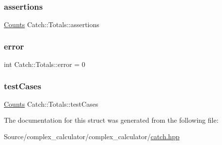 \subsubsection{\texorpdfstring{assertions}{assertions}}
{\footnotesize\ttfamily \mbox{\hyperlink{struct_catch_1_1_counts}{Counts}} Catch\+::\+Totals\+::assertions}

\mbox{\label{struct_catch_1_1_totals_a6ea14c7de7ea735a14f172a26e08a239}} 
\subsubsection{\texorpdfstring{error}{error}}
{\footnotesize\ttfamily int Catch\+::\+Totals\+::error = 0}

\mbox{\label{struct_catch_1_1_totals_adb195fe477aedee2ecea88c888f16506}} 
\subsubsection{\texorpdfstring{test\+Cases}{testCases}}
{\footnotesize\ttfamily \mbox{\hyperlink{struct_catch_1_1_counts}{Counts}} Catch\+::\+Totals\+::test\+Cases}



The documentation for this struct was generated from the following file\+:\begin{DoxyCompactItemize}
\item 
Source/complex\+\_\+calculator/complex\+\_\+calculator/\mbox{\hyperlink{catch_8hpp}{catch.\+hpp}}\end{DoxyCompactItemize}
